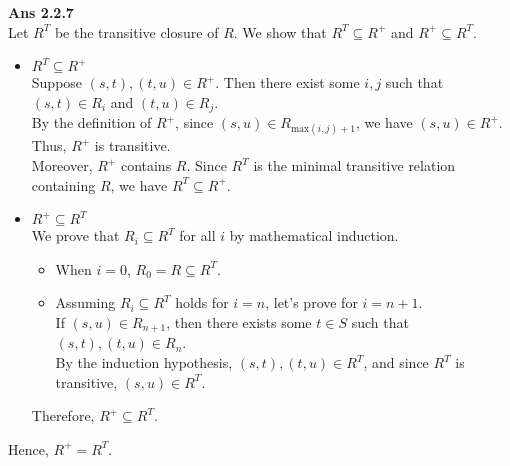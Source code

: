 \documentclass[a4paper,11pt,fleqn,dvipdfmx]{article}
\newcommand{\ansen}[1]{\noindent\textbf{Ans #1}\\[2mm]}
\newcommand{\qed}[0]{\hfill\fbox{}}
\begin{document}
    \ansen{2.2.7}
        Let $R^{T}$ be the transitive closure of $R$. We show that $R^{T} \subseteq R^{+}$ and $R^{+} \subseteq R^{T}$.
        \begin{itemize}
            \item $R^{T} \subseteq R^{+}$ \\[2mm]
                Suppose $(s,t), (t,u) \in R^{+}$. Then there exist some $i,j$ such that $(s,t) \in R_i$ and $(t,u) \in R_j$. \\
                By the definition of $R^{+}$, since $(s,u) \in R_{\mathrm{max}(i,j)+1}$, we have $(s,u) \in R^{+}$. \\
                Thus, $R^{+}$ is transitive. \\
                Moreover, $R^{+}$ contains $R$. Since $R^{T}$ is the minimal transitive relation containing $R$, we have $R^{T} \subseteq R^{+}$.
            \item $R^{+} \subseteq R^{T}$ \\[2mm]
                We prove that $R_i \subseteq R^{T}$ for all $i$ by mathematical induction.
                \begin{itemize}
                    \item When $i=0$, $R_0 = R \subseteq R^{T}$.
                    \item Assuming $R_i \subseteq R^{T}$ holds for $i=n$, let's prove for $i=n+1$. \\
                        If $(s,u) \in R_{n+1}$, then there exists some $t \in S$ such that $(s,t),(t,u) \in R_n$. \\
                        By the induction hypothesis, $(s,t),(t,u) \in R^{T}$, and since $R^{T}$ is transitive, $(s,u) \in R^{T}$.
                \end{itemize}
                Therefore, $R^{+} \subseteq R^{T}$.
        \end{itemize}
        Hence, $R^{+} = R^{T}$.\qed
\end{document}
